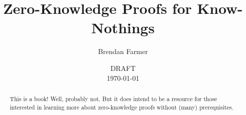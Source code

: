 \documentclass[12pt]{article}
\title{Zero-Knowledge Proofs for Know-Nothings}
\author{
  Brendan Farmer
}
\date{DRAFT\\\today}
\begin{document}
\maketitle

\begin{abstract}
This is a book! Well, probably not. But it does intend to be a resource for those interested in learning more about zero-knowledge proofs without (many) prerequisites.

\end{abstract}

\newpage
{\hypersetup{hidelinks} \tableofcontents}
\newpage








{}

\end{document}
